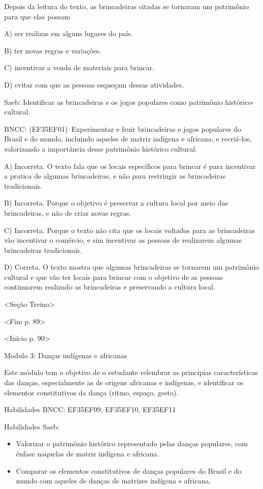 Depois da leitura do texto, as brincadeiras citadas se tornaram um
patrimônio para que elas possam

A) ser realizas em alguns lugares do país.

B) ter novas regras e variações.

C) incentivar a venda de materiais para brincar.

D) evitar com que as pessoas esqueçam dessas atividades.

Saeb: Identificar as brincadeiras e os jogos populares como patrimônio
histórico-cultural.

BNCC: (EF35EF01)~Experimentar e fruir brincadeiras e jogos populares do
Brasil e do mundo, incluindo aqueles de matriz indígena e africana, e
recriá-los, valorizando a importância desse patrimônio histórico
cultural.

A) Incorreta. O texto fala que os locais específicos para brincar é para
incentivar a pratica de algumas brincadeiras, e não para restringir as
brincadeiras tradicionais.

B) Incorreta. Porque o objetivo é preservar a cultura local por meio das
brincadeiras, e não de criar novas regras.

C) Incorreta. Porque o texto não cita que os locais voltados para as
brincadeiras vão incentivar o comércio, e sim incentivar as pessoas de
realizarem algumas brincadeiras tradicionais.

D) Correta. O texto mostra que algumas brincadeiras se tornarem um
patrimônio cultural e que vão ter locais para brincar com o objetivo de
as pessoas continuarem realizado as brincadeiras e preservando a cultura
local.

\textless{}Seção Treino\textgreater{}

\textless{}Fim p. 89\textgreater{}

\textless{}Início p. 90\textgreater{}

Modulo 3: Danças indígenas e africanas

Este módulo tem o objetivo de o estudante relembrar as principias
características das danças, especialmente as de origens africanas e
indígenas, e identificar os elementos constitutivos da dança (ritmo,
espaço, gesto).

Habilidades BNCC: EF35EF09, EF35EF10, EF35EF11

Habilidades Saeb:

\begin{itemize}
\item
  Valorizar o patrimônio histórico representado pelas danças populares,
  com ênfase naquelas de matriz indígena e africana.
\item
  Comparar os elementos constitutivos de danças populares do Brasil e do
  mundo com aqueles de danças de matrizes indígena e africana.
\end{itemize}

